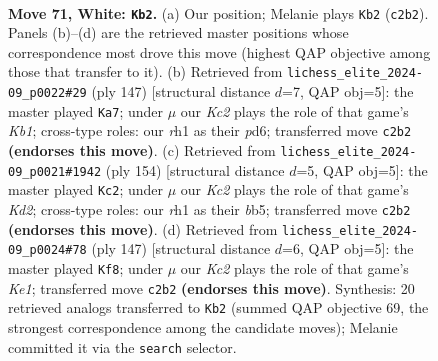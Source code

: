 \documentclass[11pt]{article}
\begin{document}
\clearpage

\begin{figure}[p]\centering
\begin{subfigure}{0.46\textwidth}\centering
\resizebox{\linewidth}{!}{%
\newchessgame
\chessboard[
  setfen={8/8/2pk4/3p4/p7/8/2K5/7r w - - 4 71},
  showmover=false,
  pgfstyle=straightmove, color=movearrow, markmove={c2-b2}
]}
\caption{}
\end{subfigure}\hfill
\begin{subfigure}{0.46\textwidth}\centering
\resizebox{\linewidth}{!}{%
\newchessgame
\chessboard[
  setfen={1k6/8/2PP4/1PK5/8/8/8/8 b - - 0 74},
  showmover=false,
  pgfstyle=straightmove, color=movearrow, markmove={b8-a7}
]}
\caption{}
\end{subfigure}
\\[4pt]
\begin{subfigure}{0.46\textwidth}\centering
\resizebox{\linewidth}{!}{%
\newchessgame
\chessboard[
  setfen={8/8/8/1bpk4/3p4/8/3K4/8 w - - 2 78},
  showmover=false,
  pgfstyle=straightmove, color=movearrow, markmove={d2-c2}
]}
\caption{}
\end{subfigure}\hfill
\begin{subfigure}{0.46\textwidth}\centering
\resizebox{\linewidth}{!}{%
\newchessgame
\chessboard[
  setfen={4k3/8/5P2/4PK2/8/8/8/8 b - - 2 74},
  showmover=false,
  pgfstyle=straightmove, color=movearrow, markmove={e8-f8}
]}
\caption{}
\end{subfigure}
\caption{\textbf{Move 71, White: \texttt{Kb2}.} (a) Our position; Melanie plays \texttt{Kb2} (\texttt{c2b2}). Panels (b)--(d) are the retrieved master positions whose correspondence most drove this move (highest QAP objective among those that transfer to it). (b) Retrieved from \texttt{lichess\_elite\_2024-09\_p0022\#29} (ply 147) [structural distance $d$=7, QAP obj=5]: the master played \texttt{Ka7}; under $\mu$ our \emph{Kc2} plays the role of that game's \emph{Kb1}; cross-type roles: our \emph{r}h1 as their \emph{p}d6; transferred move \texttt{c2b2} \textbf{(endorses this move)}. (c) Retrieved from \texttt{lichess\_elite\_2024-09\_p0021\#1942} (ply 154) [structural distance $d$=5, QAP obj=5]: the master played \texttt{Kc2}; under $\mu$ our \emph{Kc2} plays the role of that game's \emph{Kd2}; cross-type roles: our \emph{r}h1 as their \emph{b}b5; transferred move \texttt{c2b2} \textbf{(endorses this move)}. (d) Retrieved from \texttt{lichess\_elite\_2024-09\_p0024\#78} (ply 147) [structural distance $d$=6, QAP obj=5]: the master played \texttt{Kf8}; under $\mu$ our \emph{Kc2} plays the role of that game's \emph{Ke1}; transferred move \texttt{c2b2} \textbf{(endorses this move)}. Synthesis: 20 retrieved analogs transferred to \texttt{Kb2} (summed QAP objective 69, the strongest correspondence among the candidate moves); Melanie committed it via the \texttt{search} selector.}
\label{fig:thought-m140}
\end{figure}
\end{document}
